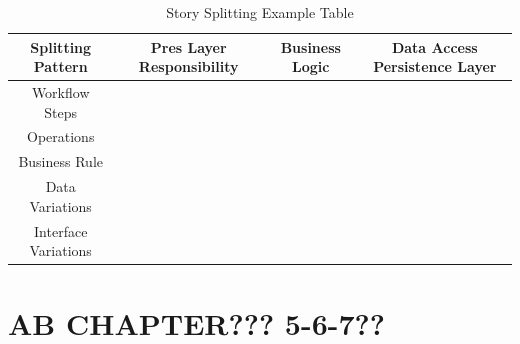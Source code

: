 \documentclass[../Main.tex]{subfiles}
\begin{document}
\begin{table}
    \centering
    \begin{tabular}{|c|c|c|c|} \hline 
         Splitting Pattern&  Pres Layer
Responsibility &  Business Logic& Data Access
Persistence Layer\\ \hline 
         Workflow Steps&  &  & \\ \hline 
         Operations&  &  & \\ \hline 
         Business Rule
&  &  & \\ \hline 
          Data Variations&  &  & \\ \hline 
 Interface Variations& & &\\ \hline
    \end{tabular}
    \caption{Story Splitting Example Table}
    \label{tab:storysplitex}
\end{table}

\section{AB CHAPTER??? 5-6-7??}
\end{document}
